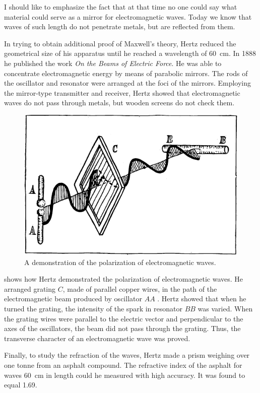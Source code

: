 I should like to emphasize the fact that at that time no one could say what material could serve as a mirror for electromagnetic waves. Today we know that waves of such length do not penetrate metals, but are reflected from them.

In trying to obtain additional proof of Maxwell's theory, Hertz reduced the geometrical size of his apparatus until he reached a wavelength of \SI{60}{\centi\meter}. In 1888 he published the work \emph{On the Beams of Electric Force}. He was able to concentrate electromagnetic energy by means of parabolic mirrors. The rods of the oscillator and resonator were arranged at the foci of the mirrors. Employing the mirror-type transmitter and receiver, Hertz showed that electromagnetic waves do not pass through metals, but wooden screens do not check them.
\begin{figure}[!ht]
\centering
\includegraphics[width=\textwidth]{figures/fig-05-07.pdf}
\caption{A demonstration of the polarization of electromagnetic waves.}
\label{fig-5.7}
\end{figure}


 shows how Hertz demonstrated the polarization of electromagnetic waves. He arranged grating $C$, made of parallel copper wires, in the path of the electromagnetic beam produced by oscillator $AA$ . Hertz showed that when he turned the grating, the intensity of the spark in resonator $BB$ was varied. When the grating wires were parallel to the electric vector and perpendicular to the axes of the oscillators, the beam did not pass through the grating. Thus, the transverse character of an electromagnetic wave was proved.

Finally, to study the refraction of the waves, Hertz made a prism weighing over one tonne from an asphalt compound. The refractive index of the asphalt for waves \SI{60}{\centi\meter} in length could he measured with high accuracy. It was found to equal 1.69.

